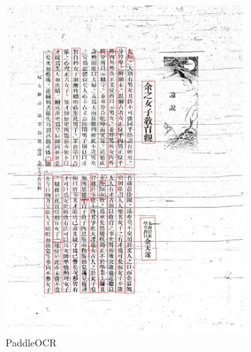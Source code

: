 \documentclass[12pt,twoside]{report}
\begin{document}
\begin{figure}[htbp]
\begin{subfigure}[b]{0.23\linewidth}
        \includegraphics[width=\linewidth]{./figures/samples/paddle_01.jpg}
        \caption{PaddleOCR}
        \label{fig:paddle_01}
    \end{subfigure}
    \hfill
    \begin{subfigure}[b]{0.23\linewidth}

\end{subfigure}
\end{figure}
\end{document}

